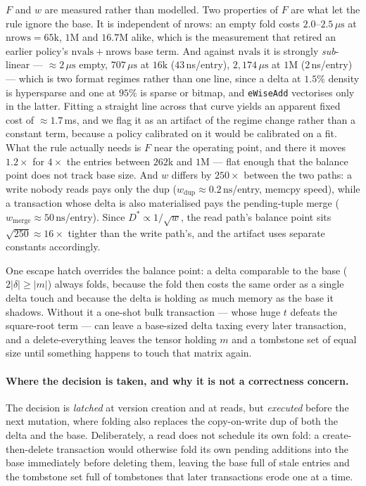 \documentclass[11pt,a4paper]{article}
\theoremstyle{plain}
\theoremstyle{definition}
\theoremstyle{remark}
\begin{document}
$F$ and $w$ are measured rather than modelled. Two properties of $F$ are what
let the rule ignore the base. It is independent of $\mathrm{nrows}$: an empty
fold costs $2.0$--$2.5\,\mu\text{s}$ at $\mathrm{nrows} = 65\text{k}$,
$1\text{M}$ and $16.7\text{M}$ alike, which is the measurement that retired an
earlier policy's $\mathrm{nvals} + \mathrm{nrows}$ base term. And against
$\mathrm{nvals}$ it is strongly \emph{sub}-linear --- $\approx\!2\,\mu\text{s}$
empty, $707\,\mu\text{s}$ at $16\text{k}$ ($43$\,ns/entry),
$2{,}174\,\mu\text{s}$ at $1\text{M}$ ($2$\,ns/entry) --- which is two format
regimes rather than one line, since a delta at $1.5\%$ density is hypersparse
and one at $95\%$ is sparse or bitmap, and \texttt{eWiseAdd} vectorises only in
the latter. Fitting a straight line across that curve yields an apparent fixed
cost of $\approx\!1.7$\,ms, and we flag it as an artifact of the regime change
rather than a constant term, because a policy calibrated on it would be
calibrated on a fit. What the rule actually needs is $F$ near the operating
point, and there it moves $1.2\times$ for $4\times$ the entries between $262$k
and $1$M --- flat enough that the balance point does not track base size. And
$w$ differs by
$250\times$ between the two paths: a write nobody reads pays only the dup
($w_{\text{dup}} \approx 0.2\,\text{ns}$/entry, memcpy speed), while a
transaction whose delta is also materialised pays the pending-tuple merge
($w_{\text{merge}} \approx 50\,\text{ns}$/entry). Since
$D^{\ast} \propto 1/\sqrt{w}$, the read path's balance point sits
$\sqrt{250} \approx 16\times$ tighter than the write path's, and the artifact
uses separate constants accordingly.

One escape hatch overrides the balance point: a delta comparable to the base
($2|\delta| \ge |m|$) always folds, because the fold then costs the same order
as a single delta touch and because the delta is holding as much memory as the
base it shadows. Without it a one-shot bulk transaction --- whose huge $t$
defeats the square-root term --- can leave a base-sized delta taxing every
later transaction, and a delete-everything leaves the tensor holding $m$ and a
tombstone set of equal size until something happens to touch that matrix
again.

\paragraph{Where the decision is taken, and why it is not a correctness
concern.} The decision is \emph{latched} at version creation and at reads, but
\emph{executed} before the next mutation, where folding also replaces the
copy-on-write dup of both the delta and the base. Deliberately, a read does not
schedule its own fold: a create-then-delete transaction would otherwise fold
its own pending additions into the base immediately before deleting them,
leaving the base full of stale entries and the tombstone set full of
tombstones that later transactions erode one at a time.
\end{document}
